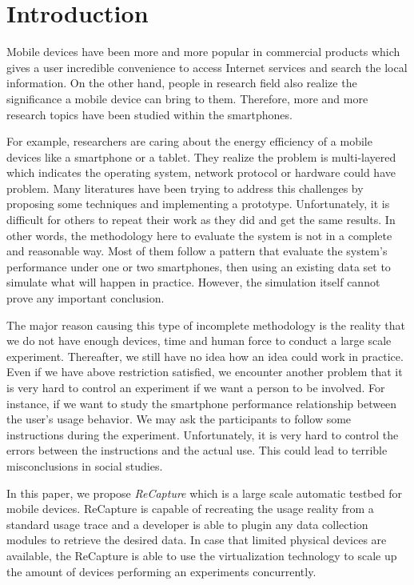\section{Introduction}\label{sec:introduction}
Mobile devices have been more and more popular in commercial products which gives a user incredible convenience to access Internet services and search the local information. On the other hand, people in research field also realize the significance a mobile device can bring to them. Therefore, more and more research topics have been studied within the smartphones.

For example, researchers are caring about the energy efficiency of a mobile devices like a smartphone or a tablet. They realize the problem is multi-layered which indicates the operating system, network protocol or hardware could have problem. Many literatures have been trying to address this challenges by proposing some techniques and implementing a prototype. Unfortunately, it is difficult for others to repeat their work as they did and get the same results. In other words, the methodology here to evaluate the system is not in a complete and reasonable way. Most of them follow a pattern that evaluate the system's performance under one or two smartphones, then using an existing data set to simulate what will happen in practice. However, the simulation itself cannot prove any important conclusion.

The major reason causing this type of incomplete methodology is the reality that we do not have enough devices, time and human force to conduct a large scale experiment. Thereafter, we still have no idea how an idea could work in practice. Even if we have above restriction satisfied, we encounter another problem that it is very hard to control an experiment if we want a person to be involved. For instance, if we want to study the smartphone performance relationship between the user's usage behavior. We may ask the participants to follow some instructions during the experiment. Unfortunately, it is very hard to control the errors between the instructions and the actual use. This could lead to terrible misconclusions in social studies.

In this paper, we propose \emph{ReCapture} which is a large scale automatic testbed for mobile devices. ReCapture is capable of recreating the usage reality from a standard usage trace and a developer is able to plugin any data collection modules to retrieve the desired data. In case that limited physical devices are available, the ReCapture is able to use the virtualization technology to scale up the amount of devices performing an experiments concurrently. 

